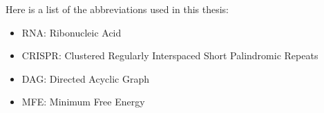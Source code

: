 Here is a list of the abbreviations used in this thesis:

\begin{itemize}
    \item RNA: Ribonucleic Acid
    \item CRISPR: Clustered Regularly Interspaced Short Palindromic Repeats
    \item DAG: Directed Acyclic Graph
    \item MFE: Minimum Free Energy
    
\end{itemize}